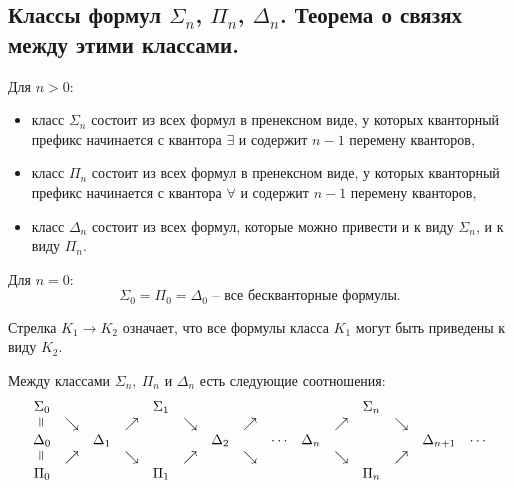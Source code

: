 \subsection{Классы формул $\Sigma_n$, $\Pi_n$, $\Delta_n$. Теорема о связях между этими классами.}

\begin{definition}
    Для $ n > 0 $:
    \begin{itemize}
        \item класс $ \Sigma_n $ состоит из всех формул в пренексном виде, у которых кванторный префикс начинается с квантора $ \exists $ и содержит $ n-1 $ перемену кванторов,
        \item класс $ \Pi_n $ состоит из всех формул в пренексном виде, у которых кванторный префикс начинается с квантора $ \forall $ и содержит $ n-1 $ перемену кванторов,
        \item класс $ \Delta_n $ состоит из всех формул, которые можно привести и к виду $ \Sigma_n $, и к виду $ \Pi_n $.
    \end{itemize}

    Для $ n=0 $:
    \[
        \Sigma_0 = \Pi_0 = \Delta_0 \text{ -- все бескванторные формулы}.
    \]
\end{definition}

\begin{note}
    Стрелка $ K_1 \rightarrow K_2 $ означает, что все формулы класса $ K_1 $ могут быть приведены к виду $ K_2 $.
\end{note}

\begin{theorem}
    Между классами $ \Sigma_n, \ \Pi_n $ и $ \Delta_n $ есть следующие соотношения:
    \[
        \begin{array}{ccccccccccccccc}
            \Sigma_0 &          &          &          & \Sigma_1 &          &          &          &        &          &          & \Sigma_n &          &              &        \\
            \verteq  & \searrow &          & \nearrow &          & \searrow &          & \nearrow &        &          & \nearrow &          & \searrow &              &        \\
            \Delta_0 &          & \Delta_1 &          &          &          & \Delta_2 &          & \cdots & \Delta_n &          &          &          & \Delta_{n+1} & \cdots \\
            \verteq  & \nearrow &          & \searrow &          & \nearrow &          & \searrow &        &          & \searrow &          & \nearrow &              &        \\
            \Pi_0    &          &          &          & \Pi_1    &          &          &          &        &          &          & \Pi_n    &          &              &
        \end{array}
    \]
\end{theorem}

